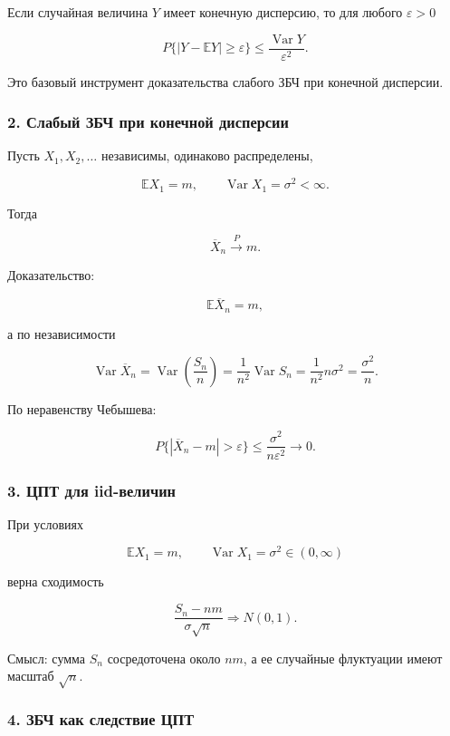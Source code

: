 \documentclass[
  11pt,
  a4paper,
]{article}
\begin{document}
Если случайная величина \(Y\) имеет конечную дисперсию, то для любого
\(\varepsilon>0\)

\[
P\{|Y-\mathbb EY|\ge\varepsilon\}
\le
\frac{\operatorname{Var}Y}{\varepsilon^2}.
\]

Это базовый инструмент доказательства слабого ЗБЧ при конечной
дисперсии.

\subsubsection{2. Слабый ЗБЧ при конечной
дисперсии}\label{ux441ux43bux430ux431ux44bux439-ux437ux431ux447-ux43fux440ux438-ux43aux43eux43dux435ux447ux43dux43eux439-ux434ux438ux441ux43fux435ux440ux441ux438ux438}

Пусть \(X_1,X_2,\ldots\) независимы, одинаково распределены,

\[
\mathbb EX_1=m,
\qquad
\operatorname{Var}X_1=\sigma^2<\infty.
\]

Тогда

\[
\overline X_n\xrightarrow{P}m.
\]

Доказательство:

\[
\mathbb E\overline X_n=m,
\]

а по независимости

\[
\operatorname{Var}\overline X_n
=
\operatorname{Var}\left(\frac{S_n}{n}\right)
=
\frac{1}{n^2}\operatorname{Var}S_n
=
\frac{1}{n^2}n\sigma^2
=
\frac{\sigma^2}{n}.
\]

По неравенству Чебышева:

\[
P\{|\overline X_n-m|>\varepsilon\}
\le
\frac{\sigma^2}{n\varepsilon^2}
\to0.
\]

\subsubsection{3. ЦПТ для
iid-величин}\label{ux446ux43fux442-ux434ux43bux44f-iid-ux432ux435ux43bux438ux447ux438ux43d}

При условиях

\[
\mathbb EX_1=m,
\qquad
\operatorname{Var}X_1=\sigma^2\in(0,\infty)
\]

верна сходимость

\[
\frac{S_n-nm}{\sigma\sqrt n}
\Rightarrow
N(0,1).
\]

Смысл: сумма \(S_n\) сосредоточена около \(nm\), а ее случайные
флуктуации имеют масштаб \(\sqrt n\).

\subsubsection{4. ЗБЧ как следствие
ЦПТ}\label{ux437ux431ux447-ux43aux430ux43a-ux441ux43bux435ux434ux441ux442ux432ux438ux435-ux446ux43fux442}
\end{document}

